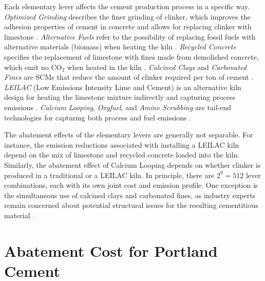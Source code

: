 \documentclass[12pt, a4paper]{article} %
\begin{document}
Each elementary lever affects the cement production process in a specific way. \emph{Optimized Grinding} describes the finer grinding of clinker, which improves the adhesion properties of cement in concrete and allows for replacing clinker with limestone \citep{ghalandari2020energy,bohm2015energy}. \emph{Alternative Fuels} refer to the possibility of replacing fossil fuels with alternative materials (biomass) when heating the kiln \citep{uson2013uses,rahman2015recent}. \emph{Recycled Concrete} specifies the replacement of limestone with fines made from demolished concrete, which emit no CO$_2$ when heated in the kiln \citep{cantero2020mechanical,cantero2021water}. \emph{Calcined Clays} and \emph{Carbonated Fines} are SCMs that reduce the amount of clinker required per ton of cement \citep{gcca2022calcined,scrivener2018calcined,sharma2021limestone,hanein2022clay,ouyang2020surface,zajac2020effect}. \emph{LEILAC} (Low Emissions Intensity Lime and Cement) is an alternative kiln design for heating the limestone mixture indirectly and capturing process emissions \citep{leilac2020low}. \emph{Calcium Looping}, \emph{Oxyfuel}, and \emph{Amine Scrubbing} are tail-end technologies for capturing both process and fuel emissions \citep{rochelle2009amine,iea2018technology,gcca2022calcium}.

The abatement effects of the elementary levers are generally not separable. For instance, the emission reductions associated with installing a LEILAC kiln depend on the mix of limestone and recycled concrete loaded into the kiln. Similarly, the abatement effect of Calcium Looping depends on whether clinker is produced in a traditional or a LEILAC kiln. In principle, there are $2^9 = 512$ lever combinations, each with its own joint cost and emission profile. One exception is the simultaneous use of calcined clays and carbonated fines, as industry experts remain concerned about potential structural issues for the resulting cementitious material \citep{zajac2020effect}.


\section{Abatement Cost for Portland Cement}
\label{sec: results}
\end{document}
